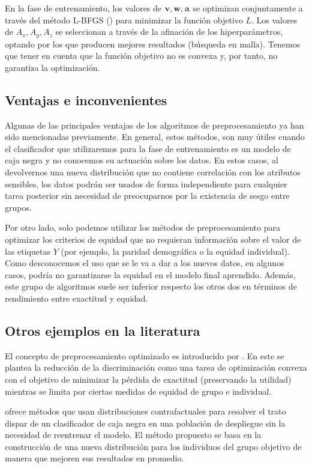 \documentclass[oneside,openright,titlepage,numbers=noenddot,openany,headinclude,footinclude=true,
cleardoublepage=empty,abstractoff,BCOR=5mm,paper=a4,fontsize=12pt,main=spanish]{scrreprt}
\begin{document}
En la fase de entrenamiento, los valores de $\textbf{v}, \textbf{w}, \upalpha$ se optimizan conjuntamente a través del método L-BFGS (\cite{lbfgs1997}) para minimizar la función objetivo $L$. Los valores de $A_x,A_y,A_z$ se seleccionan a través de la afinación de los hiperparámetros, optando por los que producen mejores resultados (búsqueda en malla). Tenemos que tener en cuenta que la función objetivo no es convexa y, por tanto, no garantiza la optimización.

\subsection*{Ventajas e inconvenientes}

Algunas de las principales ventajas de los algoritmos de preprocesamiento ya han sido mencionadas previamente. En general, estos métodos, son muy útiles cuando el clasificador que utilizaremos para la fase de entrenamiento es un modelo de caja negra y no conocemos su actuación sobre los datos. En estos casos, al devolvernos una nueva distribución que no contiene correlación con los atributos sensibles, los datos podrán ser usados de forma independiente para cualquier tarea posterior sin necesidad de preocuparnos por la existencia de sesgo entre grupos.

Por otro lado, solo podemos utilizar los métodos de preprocesamiento para optimizar los criterios de equidad que no requieran información sobre el valor de las etiquetas $Y$ (por ejemplo, la paridad demográfica o la equidad individual). Como desconocemos el uso que se le va a dar a los nuevos datos, en algunos casos, podría no garantizarse la equidad en el modelo final aprendido. Además, este grupo de algoritmos suele ser inferior respecto los otros dos en términos de rendimiento entre exactitud y equidad.


\subsection*{Otros ejemplos en la literatura}

El concepto de preprocesamiento optimizado es introducido por \cite{optimizeddata2017}. En este se plantea la reducción de la discriminación como una tarea de optimización convexa con el objetivo de minimizar la pérdida de exactitud (preservando la utilidad) mientras se limita por ciertas medidas de equidad de grupo e individual.

\cite{repairing2019} ofrece métodos que usan distribuciones contrafactuales para resolver el trato dispar de un clasificador de caja negra en una población de despliegue sin la necesidad de reentrenar el modelo. El método propuesto se basa en la construcción de una nueva distribución para los individuos del grupo objetivo de manera que mejoren sus resultados en promedio.
\end{document}
